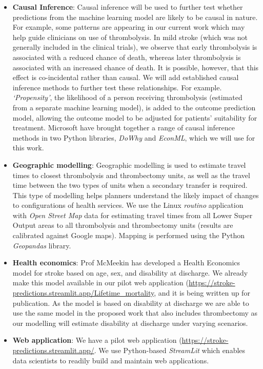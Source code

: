 \begin{itemize}
    \item \textbf{Causal Inference}: Causal inference will be used to further test whether predictions from the machine learning model are likely to be causal in nature. For example, some patterns are appearing in our current work which may help guide clinicians on use of thrombolysis. In mild stroke (which was not generally included in the clinical trials), we observe that early thrombolysis is associated with a reduced chance of death, whereas later thrombolysis is associated with an increased chance of death. It is possible, however, that this effect is co-incidental rather than causal. We will add established causal inference methods to further test these relationships. For example. \textit{`Propensity'}, the likelihood of a person receiving thrombolysis (estimated from a separate machine learning model), is added to the outcome prediction model, allowing the outcome model to be adjusted for patients' suitability for treatment. Microsoft have brought together a range of causal inference methods in two Python libraries, \textit{DoWhy} and \textit{EconML}, which we will use for this work.

    \item \textbf{Geographic modelling}: Geographic modelling is used to estimate travel times to closest thrombolysis and thrombectomy units, as well as the travel time between the two types of units when a secondary transfer is required. This type of modelling helps planners understand the likely impact of changes to configurations of health services. We use the Linux \textit{routino} application with \textit{Open Street Map} data for estimating travel times from all Lower Super Output areas to all thrombolysis and thrombectomy units (results are calibrated against Google maps). Mapping is performed using the Python \textit{Geopandas} library.

    \item \textbf{Health economics}: Prof McMeekin has developed a Health Economics model for stroke based on age, sex, and disability at discharge. We already make this model available in our pilot web application (\url{https://stroke-predictions.streamlit.app/Lifetime_mortality}, and it is being written up for publication. As the model is based on disability at discharge we are able to use the same model in the proposed work that also includes thrombectomy as our modelling will estimate disability at discharge under varying scenarios.

    \item \textbf{Web application}: We have a pilot web application (\url{https://stroke-predictions.streamlit.app/}. We use Python-based \textit{StreamLit} which enables data scientists to readily build and maintain web applications.
    
\end{itemize}





